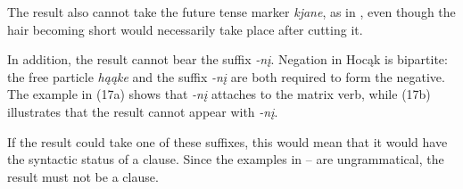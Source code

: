 \documentclass[output=paper]{LSP/langsci}
\begin{document}
The result also cannot take the future tense marker \textit{kjane}, as in , even though the hair becoming short would necessarily take place after cutting it.

\begin{exe}


\end{exe}

In addition, the result cannot bear the  suffix \textit{-nį}. Negation in Hocąk is bipartite: the free particle \textit{hąąke} and the suffix \textit{-nį} are both required to form the negative. The example in (17a) shows that \textit{-nį} attaches to the matrix verb, while (17b) illustrates that the result cannot appear with \textit{-nį}.

\begin{exe}
\ex\label{ex:rosen:17}
\begin{xlist}



\end{xlist}
\end{exe}

If the result could take one of these suffixes, this would mean that it would have the syntactic status of a clause. Since the examples in -- are ungrammatical, the result must not be a clause.
\end{document}
